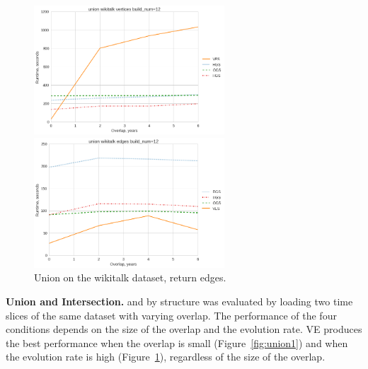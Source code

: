 \begin{figure}
\centering
\begin{minipage}{3.3in}
\centering
\includegraphics[width=2.8in]{figs/union_wikitalk_vertices_build12.png}
\caption{Union on the wikitalk dataset, return vertices.}
\label{fig:union1}
\end{minipage}
\begin{minipage}{3.3in}
\centering
\includegraphics[width=2.8in]{figs/union_wikitalk_edges_build12.png}
\caption{Union on the wikitalk dataset, return edges.}
\label{fig:union2}
\end{minipage}
\end{figure}

{\bf Union and Intersection.}   and 
by structure was evaluated by loading two time slices of the same
dataset with varying overlap.  The performance of the four conditions
depends on the size of the overlap and the evolution rate.  VE
produces the best performance when the overlap is small
(Figure~\ref{fig:union1}) and when the evolution rate is high
(Figure~\ref{fig:union2}), regardless of the size of the overlap.

